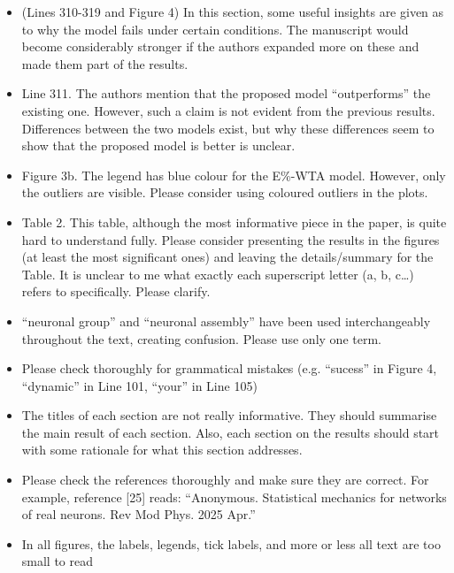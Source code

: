 \documentclass[a4paper, 11pt]{article}
\begin{document}
\begin{itemize}
    \item (Lines 310-319 and Figure 4) In this section, some useful insights are given as to why the model fails under certain conditions. The manuscript would become considerably stronger if the authors expanded more on these and made them part of the results.
    
    \item Line 311. The authors mention that the proposed model ``outperforms'' the existing one. However, such a claim is not evident from the previous results. Differences between the two models exist, but why these differences seem to show that the proposed model is better is unclear.
    
    \item Figure 3b. The legend has blue colour for the E\%-WTA model. However, only the outliers are visible. Please consider using coloured outliers in the plots.
    
    \item Table 2. This table, although the most informative piece in the paper, is quite hard to understand fully. Please consider presenting the results in the figures (at least the most significant ones) and leaving the details/summary for the Table. It is unclear to me what exactly each superscript letter (a, b, c\dots) refers to specifically. Please clarify.
    
    \item ``neuronal group'' and ``neuronal assembly'' have been used interchangeably throughout the text, creating confusion. Please use only one term.
    
    \item Please check thoroughly for grammatical mistakes (e.g. ``sucess'' in Figure 4, ``dynamic'' in Line 101, ``your'' in Line 105)
    
    \item The titles of each section are not really informative. They should summarise the main result of each section. Also, each section on the results should start with some rationale for what this section addresses.
    
    \item Please check the references thoroughly and make sure they are correct. For example, reference [25] reads: ``Anonymous. Statistical mechanics for networks of real neurons. Rev Mod Phys. 2025 Apr.''
    
    \item In all figures, the labels, legends, tick labels, and more or less all text are too small to read
\end{itemize}
\end{document}
